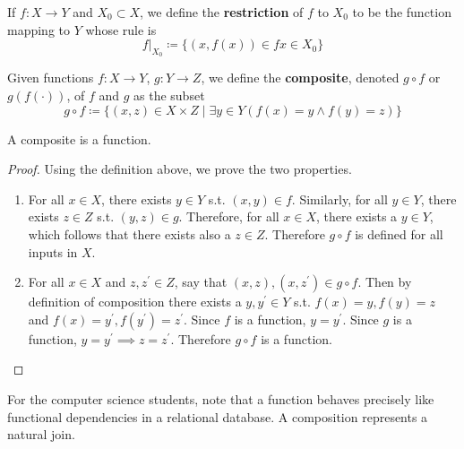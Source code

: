 \documentclass{article}
\begin{document}
    \begin{definition}[Restriction]
      If $f: X \rightarrow Y$ and $X_0 \subset X$, we define the \textbf{restriction} of $f$ to $X_0$ to be the function mapping to $Y$ whose rule is 
      \begin{equation}
        f|_{X_0} \coloneqq \{ (x, f(x)) \in f x \in X_0 \}
      \end{equation}
    \end{definition} 

    \begin{definition}[Composition]
      Given functions $f: X \rightarrow Y$, $g: Y \rightarrow Z$, we define the \textbf{composite}, denoted $g \circ f$ or $g(f(\cdot))$, of $f$ and $g$ as the subset
      \begin{equation}
        g \circ f \coloneqq \{ (x, z) \in X \times Z \mid \exists y \in Y (f(x) = y \land f(y) = z) \}
      \end{equation} 
    \end{definition}

    \begin{theorem}[Compositions]
      A composite is a function. 
    \end{theorem}
    \begin{proof}
      Using the definition above, we prove the two properties. 
      \begin{enumerate}
        \item For all $x \in X$, there exists $y \in Y$ s.t. $(x, y) \in f$. Similarly, for all $y \in Y$, there exists $z \in Z$ s.t. $(y, z) \in g$. Therefore, for all $x \in X$, there exists a $y \in Y$, which follows that there exists also a $z \in Z$. Therefore $g \circ f$ is defined for all inputs in $X$. 
        \item For all $x \in X$ and $z, z^\prime \in Z$, say that $(x, z), (x, z^\prime) \in g \circ f$. Then by definition of composition there exists a $y, y^\prime \in Y$ s.t. $f(x) = y, f(y) = z$ and $f(x) = y^\prime, f(y^\prime) = z^\prime$. Since $f$ is a function, $y = y^\prime$. Since $g$ is a function, $y = y^\prime \implies z = z^\prime$. Therefore $g \circ f$ is a function. 
      \end{enumerate}
    \end{proof}

    For the computer science students, note that a function behaves precisely like functional dependencies in a relational database. A composition represents a natural join. 
\end{document}
